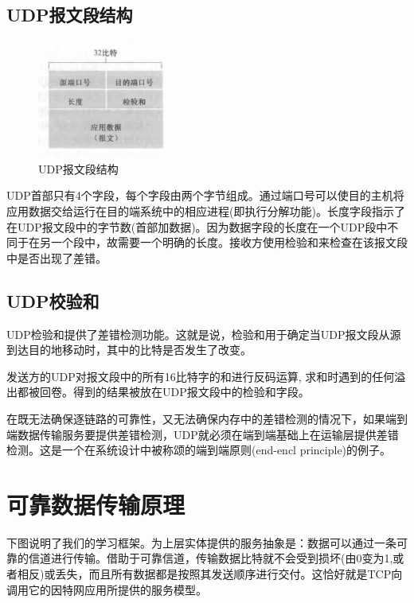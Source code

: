 \subsection{UDP报文段结构}

\begin{figure}[!htbp]
    \centering
    \includegraphics[width=0.4\textwidth]{image/chapter03/UDP报文段结构.png}
    \caption{UDP报文段结构}
\end{figure}

    UDP首部只有4个字段，每个字段由两个字节组成。通过端口号可以使目的主机将应用数据交给运行在目的端系统中的相应进程(即执行分解功能)。长度字段指示了在UDP报文段中的字节数(首部加数据)。因为数据字段的长度在一个UDP段中不同于在另一个段中，故需要一个明确的长度。接收方使用检验和来检查在该报文段中是否出现了差错。

\subsection{UDP校验和}

    UDP检验和提供了差错检测功能。这就是说，检验和用于确定当UDP报文段从源到达目的地移动时，其中的比特是否发生了改变。

    发送方的UDP对报文段中的所有16比特字的和进行反码运算, 求和时遇到的任何溢出都被回卷。得到的结果被放在UDP报文段中的检验和字段。

    在既无法确保逐链路的可靠性，又无法确保内存中的差错检测的情况下，如果端到端数据传输服务要提供差错检测，UDP就必须在端到端基础上在运输层提供差错检测。这是一个在系统设计中被称颂的端到端原则(end-encl principle)的例子。

\section{可靠数据传输原理}

    下图说明了我们的学习框架。为上层实体提供的服务抽象是：数据可以通过一条可靠的信道进行传输。借助于可靠信道，传输数据比特就不会受到损坏(由0变为1,或者相反)或丢失，而且所有数据都是按照其发送顺序进行交付。这恰好就是TCP向调用它的因特网应用所提供的服务模型。

